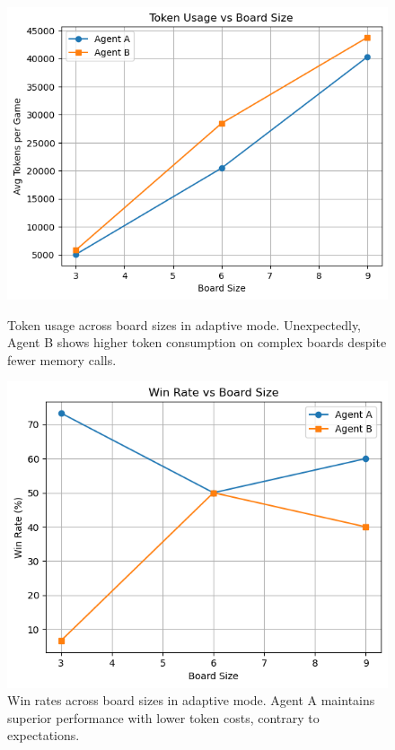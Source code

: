 \documentclass[10pt]{article}
\begin{document}
\begin{figure}[ht]
\centering
\begin{minipage}{0.48\textwidth}
  \centering
  \includegraphics[width=\textwidth]{figures/adaptive/token_usage_vs_board_size.png}
  \caption{Token usage across board sizes in adaptive mode. Unexpectedly, Agent B shows higher token consumption on complex boards despite fewer memory calls.}
  \label{fig:adaptive_token_usage}
\end{minipage}%
\hfill
\begin{minipage}{0.48\textwidth}
  \centering
  \includegraphics[width=\textwidth]{figures/adaptive/win_rate_vs_board_size.png}
  \caption{Win rates across board sizes in adaptive mode. Agent A maintains superior performance with lower token costs, contrary to expectations.}
  \label{fig:adaptive_win_rate}
\end{minipage}
\end{figure}
\end{document}
